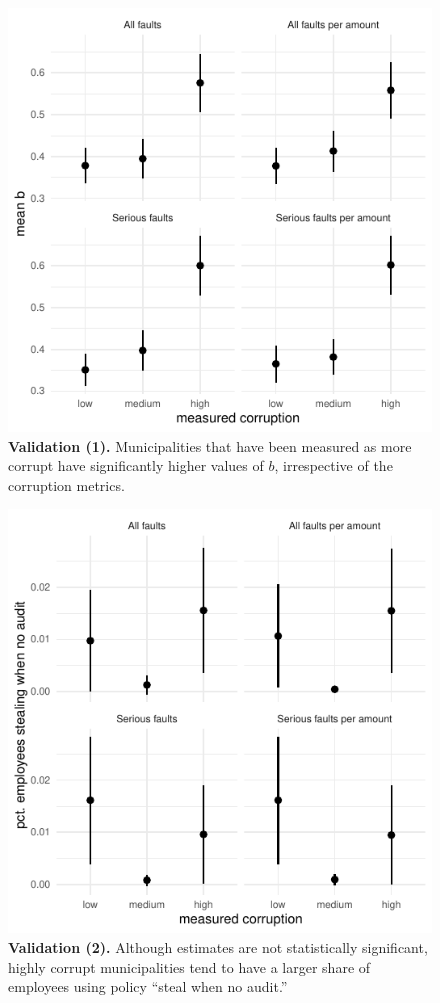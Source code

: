 \documentclass[12pt,a4paper]{article}
\theoremstyle{definition}
\begin{document}
{\begin{figure}[H]
    \centering
    \includegraphics{figures/validationStructuralAmounts.pdf}
    \caption{{\bf Validation (1).} Municipalities that have been measured as more corrupt have significantly higher values of $b$, irrespective of the corruption metrics.}
    \label{fig:validationStructuralAmounts}
\end{figure}

\begin{figure}[H]
    \centering
    \includegraphics{figures/validationStructuralStrategies.pdf}
    \caption{{\bf Validation (2).} Although estimates are not statistically significant, highly corrupt municipalities tend to have a larger share of employees using policy ``steal when no audit.''}
    \label{fig:validationStructuralStrategies}
\end{figure}

}
\end{document}
